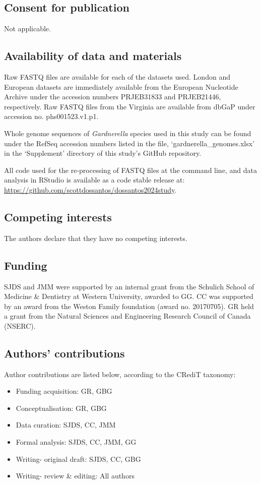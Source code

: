 \documentclass[sn-mathphys,Numbered]{sn-jnl}%
\begin{document}
\subsection{Consent for publication}\label{subsec:subsecPubConsent}
Not applicable.

\subsection{Availability of data and materials}\label{subsec:subsecDataAvail}
Raw FASTQ files are available for each of the datasets used. London and European datasets are immediately available from the European Nucleotide Archive under the accession numbers PRJEB31833 and PRJEB21446, respectively. Raw FASTQ files from the Virginia are available from dbGaP under accession no. phs001523.v1.p1.

Whole genome sequences of \textit{Gardnerella} species used in this study can be found under the RefSeq accession numbers listed in the file, `gardnerella\_genomes.xlsx' in the `Supplement' directory of this study's GitHub repository.

All code used for the re-processing of FASTQ files at the command line, and data analysis in RStudio is available as a code stable release at: \url{https://github.com/scottdossantos/dossantos2024study}.

\subsection{Competing interests}\label{subsec:subsecCompInt}
The authors declare that they have no competing interests.

\subsection{Funding}\label{subsec:subsecFunding}
SJDS and JMM were supported by an internal grant from the Schulich School of Medicine \& Dentistry at Western University, awarded to GG. CC was supported by an award from the Weston Family foundation (award no. 20170705). GR held a grant from the Natural Sciences and Engineering Research Council of Canada (NSERC).

\subsection{Authors' contributions}\label{subsec:subsecContribs}
Author contributions are listed below, according to the CRediT taxonomy:
\begin{itemize}
\item Funding acquisition: GR, GBG
\item Conceptualisation: GR, GBG
\item Data curation: SJDS, CC, JMM
\item Formal analysis: SJDS, CC, JMM, GG
\item Writing- original draft: SJDS, CC, GBG
\item Writing- review \& editing: All authors
\end{itemize}
\end{document}
